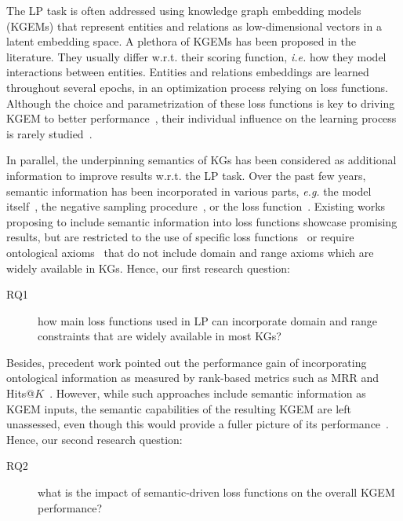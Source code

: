 \documentclass[letterpaper]{article} %
\begin{document}
The LP task is often addressed using knowledge graph embedding models (KGEMs) that represent entities and relations as low-dimensional vectors in a latent embedding space. A plethora of KGEMs has been proposed in the literature. They usually differ w.r.t. their scoring function, \textit{i.e.} how they model interactions between entities. Entities and relations embeddings are learned throughout several epochs, in an optimization process relying on loss functions. Although the choice and parametrization of these loss functions is key to driving KGEM to better performance~\cite{ali2022}, their individual influence on the learning process is rarely studied~\cite{mohamed2019}. 
 
In parallel, the underpinning semantics of KGs has been considered as additional information to improve results w.r.t. the LP task. Over the past few years, semantic information has been incorporated in various parts, \textit{e.g.} the model itself~\cite{tarp,transc,autoeter,transet,tkrl}, the negative sampling procedure~\cite{jain_iswc,krompas}, or the loss function~\cite{cao2022,damato2021,guo2015,minervini2017}. Existing works proposing to include semantic information into loss functions showcase promising results, but are restricted to the use of specific loss functions~\cite{damato2021,guo2015} or require ontological axioms~\cite{damato2021,minervini2017} that do not include domain and range axioms which are widely available in KGs. Hence, our first research question:
\begin{description}
    \item[RQ1] how main loss functions used in LP can incorporate
    domain and range constraints that are widely available in most KGs? 
\end{description}

Besides, precedent work pointed out the performance gain of incorporating ontological information as measured by rank-based metrics such as MRR and Hits@$K$~\cite{cao2022,damato2021,guo2015,minervini2017}. 
However, while such approaches include semantic information as KGEM inputs, the semantic capabilities of the resulting KGEM are left unassessed, even though this would provide a fuller picture of its performance~\cite{dl4kg,hubert2023}. Hence, our second research question:
\begin{description}
    \item[RQ2] what is the impact of semantic-driven loss functions on the overall KGEM performance?
\end{description}
\end{document}
